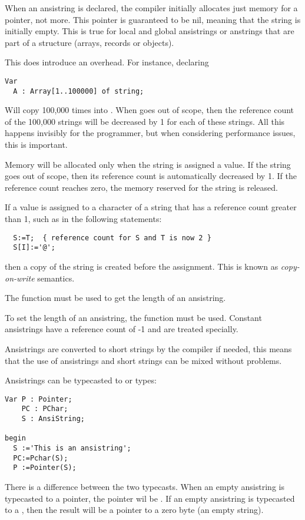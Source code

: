 When an ansistring is declared, the \fpc compiler initially
allocates just memory for a pointer, not more. This pointer is guaranteed
to be nil, meaning that the string is initially empty. This is
true for local and global ansistrings or anstrings that are part of a 
structure (arrays, records or objects).

This does introduce an overhead. For instance, declaring
\begin{verbatim}
Var
  A : Array[1..100000] of string;
\end{verbatim}
Will copy 100,000 times  into . When  goes out of scope, then
the reference count of the 100,000 strings will be decreased by 1 for each
of these strings. All this happens
invisibly for the programmer, but when considering performance issues,
this is important.

Memory will be allocated only when the string is assigned a value.
If the string goes out of scope, then its reference count is automatically 
decreased by 1. If the reference count reaches zero, the memory reserved for
the string is released.

If a value is assigned to a character of a string that has a reference count
greater than 1, such as in the following
statements:
\begin{verbatim}
  S:=T;  { reference count for S and T is now 2 }
  S[I]:='@';
\end{verbatim}
then a copy of the string is created before the assignment. This is known
as {\em copy-on-write} semantics.

The  function must be used to get the length of an
ansistring.

To set the length of an ansistring, the  function must be used.
Constant ansistrings have a reference count of -1 and are treated specially.

Ansistrings are converted to short strings by the compiler if needed,
this means that the use of ansistrings and short strings can be mixed
without problems.

Ansistrings can be typecasted to  or  types:
\begin{verbatim}
Var P : Pointer;
    PC : PChar;
    S : AnsiString;

begin
  S :='This is an ansistring';
  PC:=Pchar(S);
  P :=Pointer(S);
\end{verbatim}
There is a difference between the two typecasts. When an empty
ansistring is typecasted to a pointer, the pointer wil be . If an
empty ansistring is typecasted to a , then the result will be a pointer to a
zero byte (an empty string).

